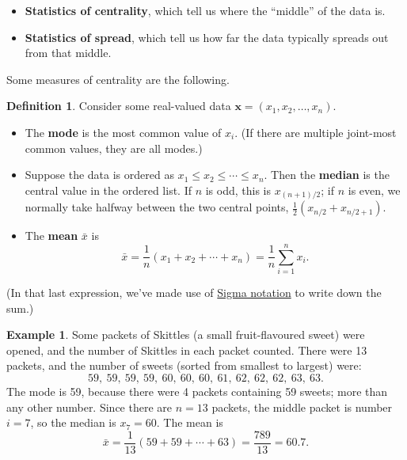 \documentclass[
  a4paper,
]{book}
\providecommand{\tightlist}{%
  \setlength{\itemsep}{0pt}\setlength{\parskip}{0pt}}
\theoremstyle{definition}
\newtheorem{definition}{Definition}[chapter]
\theoremstyle{definition}
\newtheorem{example}{Example}[chapter]
\theoremstyle{definition}
\theoremstyle{definition}
\theoremstyle{remark}
\begin{document}
\begin{itemize}
\tightlist
\item
  \textbf{Statistics of centrality}, which tell us where the ``middle'' of the data is.
\item
  \textbf{Statistics of spread}, which tell us how far the data typically spreads out from that middle.
\end{itemize}

Some measures of centrality are the following.

\begin{definition}

Consider some real-valued data \(\mathbf x = (x_1, x_2, \dots, x_n)\).

\begin{itemize}
\tightlist
\item
  The \textbf{mode} is the most common value of \(x_i\). (If there are multiple joint-most common values, they are all modes.)
\item
  Suppose the data is ordered as \(x_1 \leq x_2 \leq \cdots \leq x_n\). Then the \textbf{median} is the central value in the ordered list. If \(n\) is odd, this is \(x_{(n+1)/2}\); if \(n\) is even, we normally take halfway between the two central points, \(\frac12(x_{n/2}+x_{n/2 + 1})\).
\item
  The \textbf{mean} \(\bar x\) is
  \[ \bar x = \frac{1}{n}(x_1 + x_2 + \cdots + x_n) = \frac1n \sum_{i=1}^n x_i . \]
\end{itemize}

\end{definition}

(In that last expression, we've made use of \href{https://www.mathcentre.ac.uk/resources/workbooks/mathcentre/sigma.pdf}{Sigma notation} to write down the sum.)

\begin{example}
Some packets of Skittles (a small fruit-flavoured sweet) were opened, and the number of Skittles in each packet counted. There were 13 packets, and the number of sweets (sorted from smallest to largest) were:
\[ 59, \ 59, \ 59, \ 59, \ 60, \ 60, \ 60, \ 61, \ 62, \ 62, \ 62, \ 63, \ 63 .\]
The mode is 59, because there were 4 packets containing 59 sweets; more than any other number. Since there are \(n = 13\) packets, the middle packet is number \(i = 7\), so the median is \(x_7 = 60\). The mean is
\[ \bar x = \frac{1}{13} (59 + 59 + \cdots + 63) = \frac{789}{13} = 60.7 .\]
\end{example}
\end{document}

